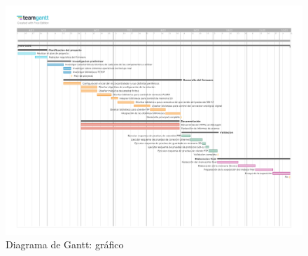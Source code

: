 \documentclass[
11pt, %
]{charter}
\begin{document}
\begin{landscape}
\begin{figure}[htpb]
\centering 
\includegraphics[height=1.1\textheight]{./Figuras/Tesis_Fiuba_CESEGantt.pdf}
\caption{Diagrama de Gantt: gráfico}
\label{fig:diagGantt}
\end{figure}

\end{landscape}
\end{document}
